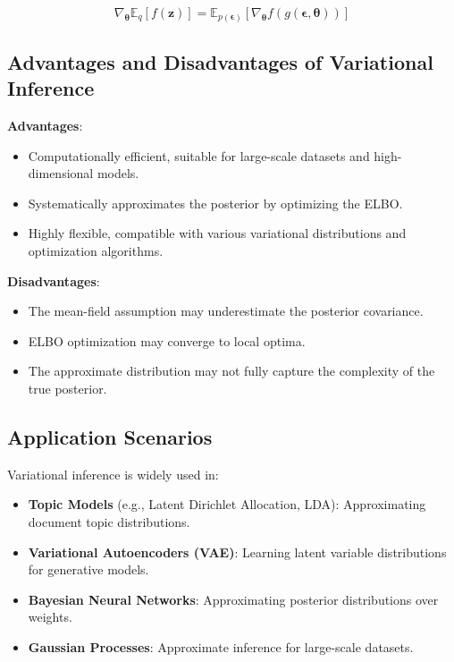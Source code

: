 \documentclass[10pt]{elegantbook}
\begin{document}
\[
\nabla_{\boldsymbol{\theta}} \mathbb{E}_q [f(\mathbf{z})] = \mathbb{E}_{p(\boldsymbol{\epsilon})} [\nabla_{\boldsymbol{\theta}} f(g(\boldsymbol{\epsilon}, \boldsymbol{\theta}))]
\]

\subsection{Advantages and Disadvantages of Variational Inference}

\textbf{Advantages}:
\begin{itemize}
    \item Computationally efficient, suitable for large-scale datasets and high-dimensional models.
    \item Systematically approximates the posterior by optimizing the ELBO.
    \item Highly flexible, compatible with various variational distributions and optimization algorithms.
\end{itemize}

\textbf{Disadvantages}:
\begin{itemize}
    \item The mean-field assumption may underestimate the posterior covariance.
    \item ELBO optimization may converge to local optima.
    \item The approximate distribution may not fully capture the complexity of the true posterior.
\end{itemize}

\subsection{Application Scenarios}

Variational inference is widely used in:
\begin{itemize}
    \item \textbf{Topic Models} (e.g., Latent Dirichlet Allocation, LDA): Approximating document topic distributions.
    \item \textbf{Variational Autoencoders (VAE)}: Learning latent variable distributions for generative models.
    \item \textbf{Bayesian Neural Networks}: Approximating posterior distributions over weights.
    \item \textbf{Gaussian Processes}: Approximate inference for large-scale datasets.
\end{itemize}
\end{document}

